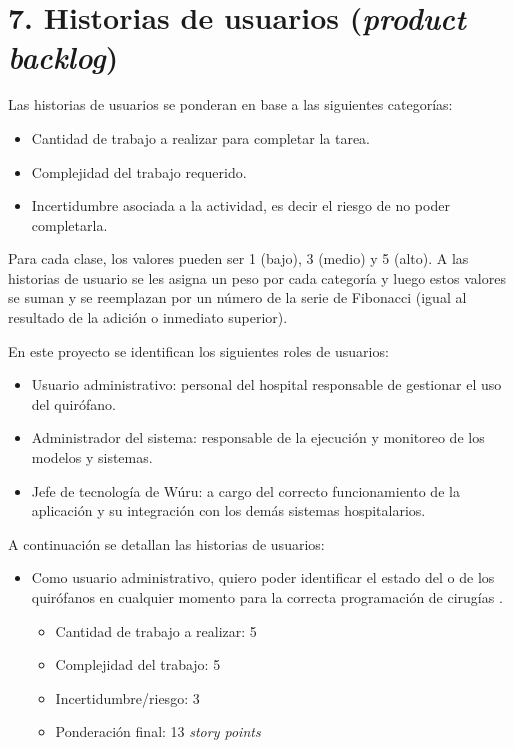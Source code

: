\documentclass[
11pt, %
]{charter}
\begin{document}



\section{7. Historias de usuarios (\textit{product backlog})}
\label{sec:backlog}

Las historias de usuarios se ponderan en base a las siguientes categorías:
\begin{itemize}
	\item Cantidad de trabajo a realizar para completar la tarea.
	\item Complejidad del trabajo requerido.
	\item Incertidumbre asociada a la actividad, es decir el riesgo de no poder completarla.
\end{itemize}

Para cada clase, los valores pueden ser 1 (bajo), 3 (medio) y 5 (alto). A las historias de usuario se les asigna un peso por cada categoría y luego estos valores se suman y se reemplazan por un número de la serie de Fibonacci (igual al resultado de la adición o inmediato superior).

En este proyecto se identifican los siguientes roles de usuarios:

\begin{itemize}
	\item Usuario administrativo: personal del hospital responsable de gestionar el uso del quirófano. 
	\item Administrador del sistema: responsable de la ejecución y monitoreo de los modelos y sistemas.
	\item Jefe de tecnología de Wúru: a cargo del correcto funcionamiento de la aplicación y su integración con los demás sistemas hospitalarios.
\end{itemize}

A continuación se detallan las historias de usuarios:

\begin{itemize}
	\item Como usuario administrativo, quiero poder identificar el estado del o de los quirófanos en cualquier momento para la correcta programación de cirugías . 
	\begin{itemize}
		\item Cantidad de trabajo a realizar: 5
		\item Complejidad del trabajo: 5
		\item Incertidumbre/riesgo: 3
		\item Ponderación final: 13 \textit{story points}
	\end{itemize}
\end{itemize}
\end{document}
